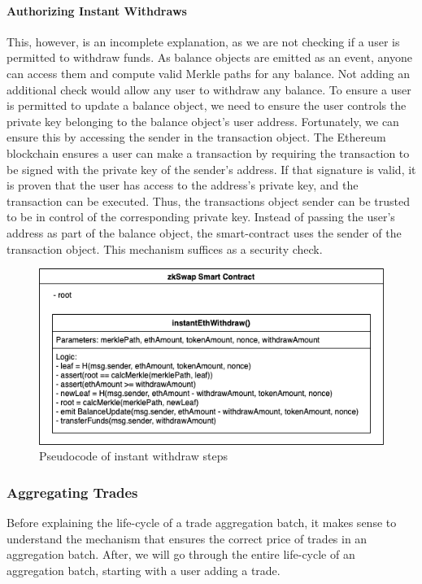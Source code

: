 \documentclass[../../thesis.tex]{subfiles}
\begin{document}
\paragraph{Authorizing Instant Withdraws}
This, however, is an incomplete explanation, as we are not checking if a user is permitted to withdraw funds. As balance objects are emitted as an event, anyone can access them and compute valid Merkle paths for any balance. Not adding an additional check would allow any user to withdraw any balance. To ensure a user is permitted to update a balance object, we need to ensure the user controls the private key belonging to the balance object's user address. Fortunately, we can ensure this by accessing the sender in the transaction object. The Ethereum blockchain ensures a user can make a transaction by requiring the transaction to be signed with the private key of the sender's address. If that signature is valid, it is proven that the user has access to the address's private key, and the transaction can be executed. Thus, the transactions object sender can be trusted to be in control of the corresponding private key. Instead of passing the user's address as part of the balance object, the smart-contract uses the sender of the transaction object. This mechanism suffices as a security check.

\begin{figure}[h]
    \centerline{\includegraphics[totalheight=5cm]{diagrams/instantWithdraw.png}}
    \caption{Pseudocode of instant withdraw steps}
    \label{fig:instWith}
\end{figure}

\subsubsection{Aggregating Trades}
Before explaining the life-cycle of a trade aggregation batch, it makes sense to understand the mechanism that ensures the correct price of trades in an aggregation batch. After, we will go through the entire life-cycle of an aggregation batch, starting with a user adding a trade. 
\end{document}
